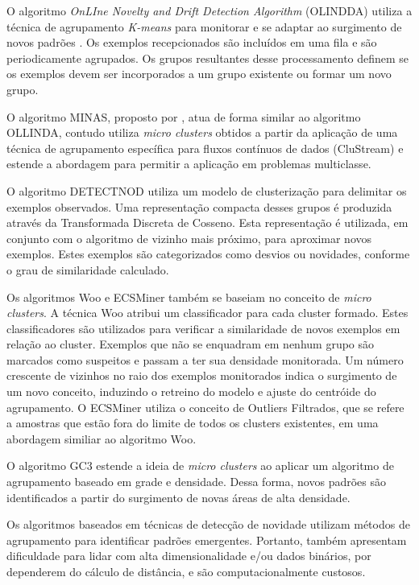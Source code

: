 \documentclass[msc, classic, a4paper]{ufbathesis}
\begin{document}
O algoritmo \textit{OnLIne Novelty and Drift Detection Algorithm} (OLINDDA) utiliza a técnica de agrupamento \textit{K-means} para monitorar e se adaptar ao surgimento de novos padrões \cite{Spinosa:2007:OCA:1244002.1244107}.
Os exemplos recepcionados são incluídos em uma fila e são periodicamente agrupados. Os grupos resultantes desse processamento definem se os exemplos devem ser incorporados a um grupo existente ou formar um novo grupo.

O algoritmo MINAS, proposto por , atua de forma similar ao algoritmo OLLINDA, contudo utiliza \textit{micro clusters} obtidos a partir da aplicação de uma técnica de agrupamento específica para fluxos contínuos de dados (CluStream) e estende a abordagem para permitir a aplicação em problemas multiclasse.

O algoritmo DETECTNOD \cite{Hashemi:Hayat:DETECTNOD:2010} utiliza um modelo de clusterização para delimitar os exemplos observados.
Uma representação compacta desses grupos é produzida através da Transformada Discreta de Cosseno. Esta representação é utilizada, em conjunto com o algoritmo de vizinho mais próximo, para aproximar novos exemplos.
Estes exemplos são categorizados como desvios ou novidades, conforme o grau de similaridade calculado.

Os algoritmos Woo \cite{Lee:Wang:Ryu:2007} e ECSMiner \cite{Masud:2011:CNC:1978259.1978529} também se baseiam no conceito de \textit{micro clusters}. A técnica Woo atribui um classificador para cada cluster formado. Estes classificadores são utilizados para verificar a similaridade de novos exemplos em relação ao cluster. Exemplos que não se enquadram em nenhum grupo são marcados como suspeitos e passam a ter sua densidade monitorada. Um número crescente de vizinhos no raio dos exemplos monitorados indica o surgimento de um novo conceito, induzindo o retreino do modelo e ajuste do centróide do agrupamento.
O ECSMiner \cite{Masud:2011:CNC:1978259.1978529} utiliza o conceito de Outliers Filtrados, que se refere a amostras que estão fora do limite de todos os clusters existentes, em uma abordagem similiar ao algoritmo Woo.

O algoritmo GC3 \cite{Sethi2016b:GC3} estende a ideia de \textit{micro clusters} ao aplicar um algoritmo de agrupamento baseado em grade e densidade. Dessa forma, novos padrões são identificados a partir do surgimento de novas áreas de alta densidade.

Os algoritmos baseados em técnicas de detecção de novidade utilizam métodos de agrupamento para identificar padrões emergentes. Portanto, também apresentam dificuldade para lidar com alta dimensionalidade e/ou dados binários, por dependerem do cálculo de distância, e são computacionalmente custosos.
\end{document}
